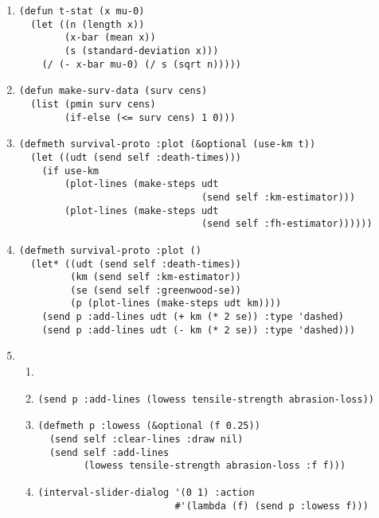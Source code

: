 \newpage
{}
\begin{enumerate}
\item
\begin{verbatim}
(defun t-stat (x mu-0)
  (let ((n (length x))
        (x-bar (mean x))
        (s (standard-deviation x)))
    (/ (- x-bar mu-0) (/ s (sqrt n)))))
\end{verbatim}

\item
\begin{verbatim}
(defun make-surv-data (surv cens)
  (list (pmin surv cens)
        (if-else (<= surv cens) 1 0)))
\end{verbatim}

\item
\begin{verbatim}
(defmeth survival-proto :plot (&optional (use-km t))
  (let ((udt (send self :death-times)))
    (if use-km
        (plot-lines (make-steps udt
                                (send self :km-estimator)))
        (plot-lines (make-steps udt
                                (send self :fh-estimator))))))
\end{verbatim}

\item
\begin{verbatim}
(defmeth survival-proto :plot ()
  (let* ((udt (send self :death-times))
         (km (send self :km-estimator))
         (se (send self :greenwood-se))
         (p (plot-lines (make-steps udt km))))
    (send p :add-lines udt (+ km (* 2 se)) :type 'dashed)
    (send p :add-lines udt (- km (* 2 se)) :type 'dashed)))
\end{verbatim}

\item
\begin{enumerate}
\item {}
\item
\begin{verbatim}
(send p :add-lines (lowess tensile-strength abrasion-loss))
\end{verbatim}
\item
\begin{verbatim}
(defmeth p :lowess (&optional (f 0.25))
  (send self :clear-lines :draw nil)
  (send self :add-lines
        (lowess tensile-strength abrasion-loss :f f)))
\end{verbatim}
\item
\begin{verbatim}
(interval-slider-dialog '(0 1) :action
                        #'(lambda (f) (send p :lowess f)))
\end{verbatim}
\end{enumerate}
\end{enumerate}

